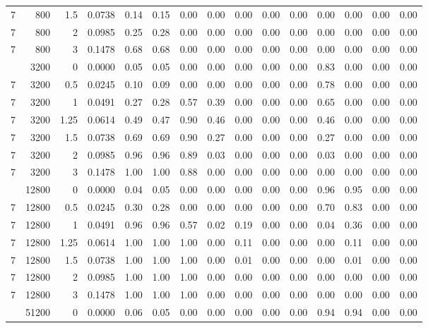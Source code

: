 \begin{table}[!htbp]
\begin{adjustbox}{max width=\textwidth, max totalheight=0.74\textheight}
\begin{tabular}{rrrrrrrrrrrrrrr}
7 & 800 & 1.5 & 0.0738 & 0.14 & 0.15 & 0.00 & 0.00 & 0.00 & 0.00 & 0.00 & 0.00 & 0.00 & 0.00 & 0.00 \\
7 & 800 & 2 & 0.0985 & 0.25 & 0.28 & 0.00 & 0.00 & 0.00 & 0.00 & 0.00 & 0.00 & 0.00 & 0.00 & 0.00 \\
7 & 800 & 3 & 0.1478 & 0.68 & 0.68 & 0.00 & 0.00 & 0.00 & 0.00 & 0.00 & 0.00 & 0.00 & 0.00 & 0.00 \\
\addlinespace
7 & 3200 & 0 & 0.0000 & 0.05 & 0.05 & 0.00 & 0.00 & 0.00 & 0.00 & 0.00 & 0.83 & 0.00 & 0.00 & 0.00 \\
7 & 3200 & 0.5 & 0.0245 & 0.10 & 0.09 & 0.00 & 0.00 & 0.00 & 0.00 & 0.00 & 0.78 & 0.00 & 0.00 & 0.00 \\
7 & 3200 & 1 & 0.0491 & 0.27 & 0.28 & 0.57 & 0.39 & 0.00 & 0.00 & 0.00 & 0.65 & 0.00 & 0.00 & 0.00 \\
7 & 3200 & 1.25 & 0.0614 & 0.49 & 0.47 & 0.90 & 0.46 & 0.00 & 0.00 & 0.00 & 0.46 & 0.00 & 0.00 & 0.00 \\
7 & 3200 & 1.5 & 0.0738 & 0.69 & 0.69 & 0.90 & 0.27 & 0.00 & 0.00 & 0.00 & 0.27 & 0.00 & 0.00 & 0.00 \\
7 & 3200 & 2 & 0.0985 & 0.96 & 0.96 & 0.89 & 0.03 & 0.00 & 0.00 & 0.00 & 0.03 & 0.00 & 0.00 & 0.00 \\
7 & 3200 & 3 & 0.1478 & 1.00 & 1.00 & 0.88 & 0.00 & 0.00 & 0.00 & 0.00 & 0.00 & 0.00 & 0.00 & 0.00 \\
\addlinespace
7 & 12800 & 0 & 0.0000 & 0.04 & 0.05 & 0.00 & 0.00 & 0.00 & 0.00 & 0.00 & 0.96 & 0.95 & 0.00 & 0.00 \\
7 & 12800 & 0.5 & 0.0245 & 0.30 & 0.28 & 0.00 & 0.00 & 0.00 & 0.00 & 0.00 & 0.70 & 0.83 & 0.00 & 0.00 \\
7 & 12800 & 1 & 0.0491 & 0.96 & 0.96 & 0.57 & 0.02 & 0.19 & 0.00 & 0.00 & 0.04 & 0.36 & 0.00 & 0.00 \\
7 & 12800 & 1.25 & 0.0614 & 1.00 & 1.00 & 1.00 & 0.00 & 0.11 & 0.00 & 0.00 & 0.00 & 0.11 & 0.00 & 0.00 \\
7 & 12800 & 1.5 & 0.0738 & 1.00 & 1.00 & 1.00 & 0.00 & 0.01 & 0.00 & 0.00 & 0.00 & 0.01 & 0.00 & 0.00 \\
7 & 12800 & 2 & 0.0985 & 1.00 & 1.00 & 1.00 & 0.00 & 0.00 & 0.00 & 0.00 & 0.00 & 0.00 & 0.00 & 0.00 \\
7 & 12800 & 3 & 0.1478 & 1.00 & 1.00 & 1.00 & 0.00 & 0.00 & 0.00 & 0.00 & 0.00 & 0.00 & 0.00 & 0.00 \\
\addlinespace
7 & 51200 & 0 & 0.0000 & 0.06 & 0.05 & 0.00 & 0.00 & 0.00 & 0.00 & 0.00 & 0.94 & 0.94 & 0.00 & 0.00 \\

\end{tabular}
\end{adjustbox}
\end{table}
